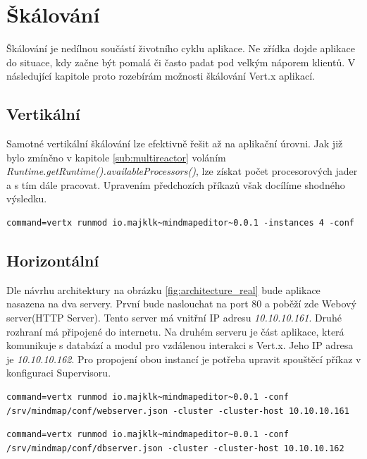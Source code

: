 \section{Škálování}\label{sub:Scaling}

Škálování je nedílnou součástí životního cyklu aplikace. Ne zřídka dojde aplikace do situace, kdy začne být pomalá či často padat pod velkým náporem klientů. V následující kapitole proto rozebírám možnosti škálování Vert.x aplikací.

\FloatBarrier

\subsection{Vertikální}

Samotné vertikální škálování lze efektivně řešit až na aplikační úrovni. Jak již bylo zmíněno v kapitole \ref{sub:multireactor} voláním \emph{Runtime.getRuntime().availableProcessors()}, lze získat počet procesorových jader a s tím dále pracovat. Upravením předchozích příkazů však docílíme shodného výsledku.

\begin{lstlisting}
command=vertx runmod io.majklk~mindmapeditor~0.0.1 -instances 4 -conf
\end{lstlisting}

\subsection{Horizontální}\label{sub:praktCluster}

Dle návrhu architektury na obrázku \ref{fig:architecture_real} bude aplikace nasazena na dva servery. První bude naslouchat na port 80 a poběží zde Webový server(HTTP Server). Tento server má vnitřní IP adresu \emph{10.10.10.161}. Druhé rozhraní má připojené do internetu. Na druhém serveru je část aplikace, která komunikuje s databází a modul pro vzdálenou interakci s Vert.x. Jeho IP adresa je \emph{10.10.10.162}. Pro propojení obou instancí je potřeba upravit spouštěcí příkaz v konfiguraci Supervisoru.

\begin{lstlisting}[caption=Spuštění clusteru na Serveru 1]
command=vertx runmod io.majklk~mindmapeditor~0.0.1 -conf /srv/mindmap/conf/webserver.json -cluster -cluster-host 10.10.10.161
\end{lstlisting}

\begin{lstlisting}[caption=Spuštění clusteru na Serveru 2]
command=vertx runmod io.majklk~mindmapeditor~0.0.1 -conf /srv/mindmap/conf/dbserver.json -cluster -cluster-host 10.10.10.162
\end{lstlisting}

